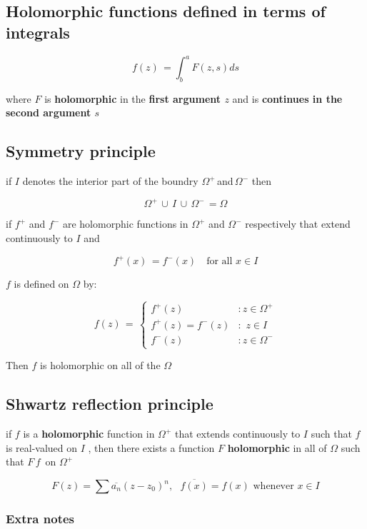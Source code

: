 \documentclass[11pt]{article}
\begin{document}
    \subsection{Holomorphic functions defined in terms of
integrals}\label{holomorphic-functions-defined-in-terms-of-integrals}

\[f(z)\,=\int_{b}^{a}{F(z,s)ds}\]

where \(F\) is \textbf{holomorphic} in the \textbf{first argument \(z\)}
and is \textbf{continues in the second argument \(s\)}

    \subsection{Symmetry principle}\label{symmetry-principle}

if \(I\) denotes the interior part of the boundry
\(\Omega^{+}\,\)and\(\,\Omega^{-}\) then

\[\Omega^{+}\,\cup\,I\,\cup\,\Omega^{-}\,=\Omega\]

if \(f^{+}\) and \(f^{-}\) are holomorphic functions in \(\Omega^{+}\)
and \(\Omega^{-}\) respectively that extend continuously to \(I\) and

\[f^{+}(x)\,=f^{-}(x)\quad\text{for all}\,\, x\in I\]

\(f\) is defined on \(\Omega\) by:

\[f(z)\,=\,\left\{ \begin{array}{cl}f^{+}(z)&: z \in \Omega^{+} \\
f^{+}(z)=f^{-}(z)&:\,\,z\in I \\ 
f^{-}(z)&: z\in\Omega^{-}\end{array}\right.\]

Then \(f\) is holomorphic on all of the \(\Omega\)

    \subsection{Shwartz reflection
principle}\label{shwartz-reflection-principle}

if \(f\) is a \textbf{holomorphic} function in \(\Omega^{+}\) that
extends continuously to \(I\) such that \(f\) is real-valued on
\(I\,\,\), then there exists a function \(F\) \textbf{holomorphic} in
all of \(\Omega\) such that \(F\,f\,\) on \(\Omega^{+}\)

\[F(z)=\sum \overline{a_{n}}(z-z_{0})^{n},\,\,\,\,\overline{f(x)}=f(x)\,\,\text{whenever}\,\, x\in I\]

    \subsubsection{Extra notes}\label{extra-notes}
\end{document}
